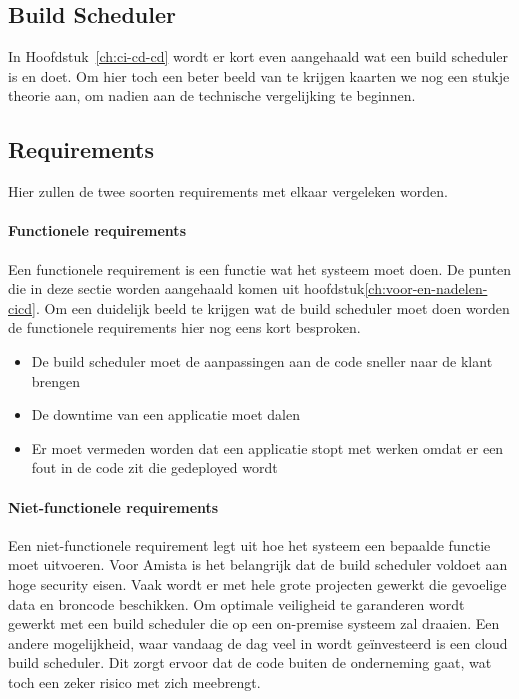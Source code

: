         \subsection{Build Scheduler}
        \label{subsec:build-scheduler}
        In Hoofdstuk~\ref{ch:ci-cd-cd} wordt er kort even aangehaald wat een build scheduler is en doet. Om hier toch een beter beeld van te krijgen kaarten we nog een stukje theorie aan, om nadien aan de technische vergelijking te beginnen.
        
        
        \subsection{Requirements}
        \label{subsec:requirements}
        Hier zullen de twee soorten requirements met elkaar vergeleken worden.

            \paragraph{Functionele requirements}
            Een functionele requirement is een functie wat het systeem moet doen.
            De punten die in deze sectie worden aangehaald komen uit hoofdstuk\ref{ch:voor-en-nadelen-cicd}. Om een duidelijk beeld te krijgen wat de build scheduler moet doen worden de functionele requirements hier nog eens kort besproken.
            \begin{itemize}
                \item De build scheduler moet de aanpassingen aan de code sneller naar de klant brengen
                \item De downtime van een applicatie moet dalen
                \item Er moet vermeden worden dat een applicatie stopt met werken omdat er een fout in de code zit die gedeployed wordt
            \end{itemize}
            
            \paragraph{Niet-functionele requirements}
            Een niet-functionele requirement legt uit hoe het systeem een bepaalde functie moet uitvoeren. Voor Amista is het belangrijk dat de build scheduler voldoet aan hoge security eisen. Vaak wordt er met hele grote projecten gewerkt die gevoelige data en broncode beschikken. Om optimale veiligheid te garanderen wordt gewerkt met een build scheduler die op een on-premise systeem zal draaien. Een andere mogelijkheid, waar vandaag de dag veel in wordt geïnvesteerd is een cloud build scheduler. Dit zorgt ervoor dat de code buiten de onderneming gaat, wat toch een zeker risico met zich meebrengt.


